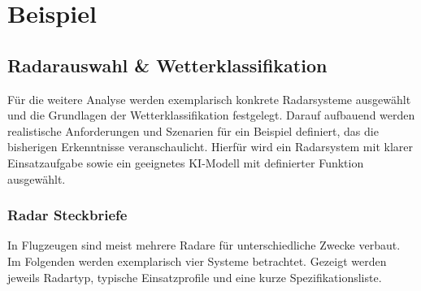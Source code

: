 \part{Beispiel}
\chapter{Radarauswahl \& Wetterklassifikation}\label{chap:szenarien}

Für die weitere Analyse werden exemplarisch konkrete Radarsysteme ausgewählt und 
die Grundlagen der Wetterklassifikation festgelegt. Darauf aufbauend werden 
realistische Anforderungen und Szenarien für ein Beispiel definiert, das die 
bisherigen Erkenntnisse veranschaulicht. Hierfür wird ein Radarsystem mit klarer 
Einsatzaufgabe sowie ein geeignetes KI-Modell mit definierter Funktion ausgewählt.

\section{Radar Steckbriefe} \label{sec:radar_steckbrief}

In Flugzeugen sind meist mehrere Radare für unterschiedliche Zwecke verbaut. 
Im Folgenden werden exemplarisch vier Systeme betrachtet. Gezeigt werden jeweils Radartyp, 
typische Einsatzprofile und eine kurze Spezifikationsliste.


